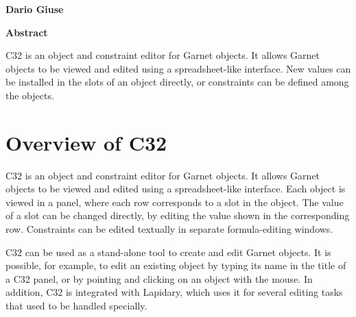 


\begin{titlepage}
\begin{titlebox}
\vspace{0.6 inch}


{\bf Dario Giuse}
\vspace{0.3 line}
\value{date}
\end{titlebox}
\vspace{0.5 inch}
\begin{center}
{\bf Abstract}\end{center}
\begin{text}
C32 is an object and constraint editor for Garnet objects.  It allows
Garnet objects to be viewed and edited using a spreadsheet-like interface.
New values can be installed in the slots of an object directly, or constraints
can be defined among the objects.
\vspace{0.5 inch}

\end{text}
\end{titlepage}





\chapter{Overview of C32}
\label{c32}

C32 \cite{C32} is an object and constraint editor for Garnet objects.  It
allows Garnet objects to be viewed and edited using a spreadsheet-like
interface.  Each object is viewed in a panel, where each row corresponds
to a slot in the object.  The value of a slot can be changed directly, by
editing the value shown in the corresponding row.  Constraints can be
edited textually in separate formula-editing windows.

C32 can be used as a stand-alone tool to create and edit Garnet objects.
It is possible, for example, to edit an existing object by typing its name
in the title of a C32 panel, or by pointing and clicking on an object with
the mouse.  In addition, C32 is integrated with Lapidary, which uses it
for several editing tasks that used to be handled specially.

